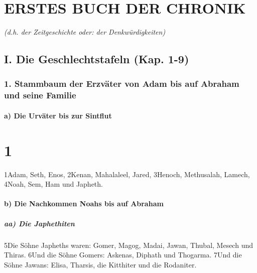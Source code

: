 \hypertarget{erstes-buch-der-chronik}{%
\section{ERSTES BUCH DER CHRONIK}\label{erstes-buch-der-chronik}}

\emph{(d.h. der Zeitgeschichte oder: der Denkwürdigkeiten)}

\hypertarget{i.-die-geschlechtstafeln-kap.-1-9}{%
\subsection{I. Die Geschlechtstafeln (Kap.
1-9)}\label{i.-die-geschlechtstafeln-kap.-1-9}}

\hypertarget{stammbaum-der-erzvuxe4ter-von-adam-bis-auf-abraham-und-seine-familie}{%
\subsubsection{1. Stammbaum der Erzväter von Adam bis auf Abraham und
seine
Familie}\label{stammbaum-der-erzvuxe4ter-von-adam-bis-auf-abraham-und-seine-familie}}

\hypertarget{a-die-urvuxe4ter-bis-zur-sintflut}{%
\paragraph{a) Die Urväter bis zur
Sintflut}\label{a-die-urvuxe4ter-bis-zur-sintflut}}

\hypertarget{section}{%
\section{1}\label{section}}

1Adam, Seth, Enos, 2Kenan, Mahalaleel, Jared, 3Henoch, Methusalah,
Lamech, 4Noah, Sem, Ham und Japheth.

\hypertarget{b-die-nachkommen-noahs-bis-auf-abraham}{%
\paragraph{b) Die Nachkommen Noahs bis auf
Abraham}\label{b-die-nachkommen-noahs-bis-auf-abraham}}

\hypertarget{aa-die-japhethiten}{%
\subparagraph{aa) Die Japhethiten}\label{aa-die-japhethiten}}

5Die Söhne Japheths waren: Gomer, Magog, Madai, Jawan, Thubal, Mesech
und Thiras. 6Und die Söhne Gomers: Askenas, Diphath und Thogarma. 7Und
die Söhne Jawans: Elisa, Tharsis, die Kitthiter und die Rodaniter.

